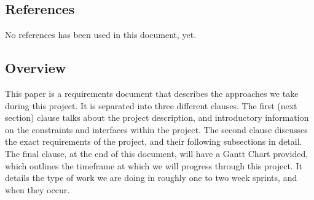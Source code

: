 \documentclass[letterpaper,10pt,titlepage,draftclsnofoot,onecolumn,compsoc,utf8,latin1]{IEEEtran}
\begin{document}
\subsection{References}

\begin{singlespace}
\noindent
No references has been used in this document, yet.
\end{singlespace}
\subsection{Overview}
\begin{singlespace}
\noindent
This paper is a requirements document that describes the approaches we take during this project. It is separated into three different clauses. The first (next section) clause talks about the project description, and introductory information on the constraints and interfaces within the project. The second clause discusses the exact requirements of the project, and their following subsections in detail. The final clause, at the end of this document, will have a Gantt Chart provided, which outlines the timeframe at which we will progress through this project. It details the type of work we are doing in roughly one to two week sprints, and when they occur.
\end{singlespace}
\end{document}

